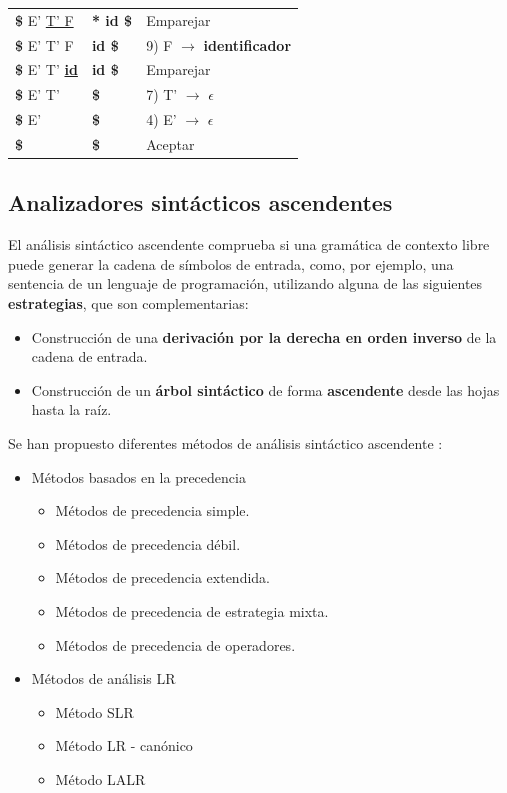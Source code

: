 \begin{table}[!t]
\begin{tabular}{l|l|l}
        {\bf \$} E' \underline{T' F {\bf *}}     & \textbf{ {*}  id \$}            & Emparejar \\
        {\bf \$} E' T' {F}                       & \textbf{ {id} \$}               &  9) F $\rightarrow$ {\bf identificador} \\
        {\bf \$} E' T' \underline{{\bf id}}      & \textbf{ {id} \$}               &  Emparejar  \\
        {\bf \$} E' {T'}                         & \textbf{ {\$}}                  & 7) T' $\rightarrow$ $\epsilon$ \\
        {\bf \$} {E'}                            & \textbf{ {\$}}                  & 4) E' $\rightarrow$ $\epsilon$ \\
        {\bf \$}                                 & \textbf{ {\$}}                  &  Aceptar\\
       \hline
    \end{tabular}
\end{table}


\subsection{Analizadores sintácticos ascendentes} \label{sec:ascendente}

El análisis sintáctico ascendente comprueba si una gramática de contexto libre puede generar la cadena de símbolos de  entrada, como, por ejemplo, una sentencia de un lenguaje de programación, utilizando alguna de las siguientes {\bf estrategias}, que son complementarias:
\begin{itemize}
\item Construcción de una \textbf{derivación por la derecha en orden inverso} de la cadena de entrada.
\item Construcción de un \textbf{árbol sintáctico} de forma \textbf{ascendente} desde las hojas hasta la raíz.
\end{itemize}


Se han propuesto diferentes métodos de análisis sintáctico ascendente \cite{aho2008}:
\begin{itemize}
 \item Métodos basados en la precedencia
    \begin{itemize}
    \item Métodos de precedencia simple.
    \item Métodos de precedencia débil.
    \item Métodos de precedencia extendida.
    \item Métodos de precedencia de estrategia mixta.
    \item Métodos de precedencia de operadores.
\end{itemize}
 \item Métodos de análisis LR
  \begin{itemize}
      \item Método SLR
      \item Método LR - canónico
      \item Método LALR
  \end{itemize}
\end{itemize}

